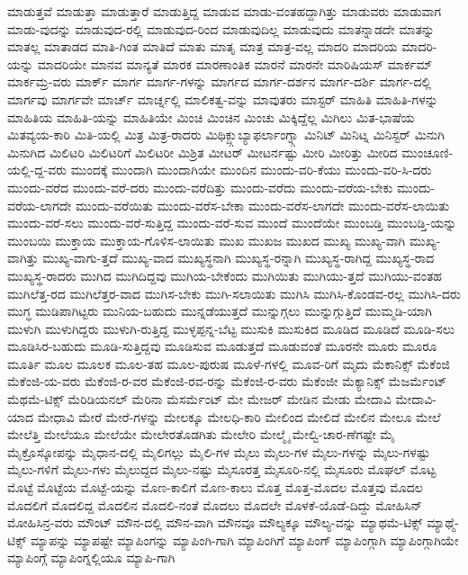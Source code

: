 {ಮಾಡುತ್ತವೆ
ಮಾಡುತ್ತಾ
ಮಾಡುತ್ತಾರೆ
ಮಾಡುತ್ತಿದ್ದ
ಮಾಡುವ
ಮಾಡು-ವಂತಹದ್ದಾಗಿತ್ತು
ಮಾಡುವರು
ಮಾಡುವಾಗ
ಮಾಡು-ವುದನ್ನು
ಮಾಡುವುದ-ರಲ್ಲಿ
ಮಾಡುವುದ-ರಿಂದ
ಮಾಡುವುದಿಲ್ಲ
ಮಾಡುವುದು
ಮಾತನ್ನಾಡದೇ
ಮಾತನ್ನು
ಮಾತಲ್ಲ
ಮಾತಾಡದ
ಮಾತಿ-ಗಿಂತ
ಮಾತಿದೆ
ಮಾತು
ಮಾತೃ
ಮಾತ್ರ
ಮಾತ್ರ-ವಲ್ಲ
ಮಾದರಿ
ಮಾದರಿಯ
ಮಾದರಿ-ಯನ್ನು
ಮಾದರಿಯೇ
ಮಾನವ
ಮಾನ್ಯತೆ
ಮಾರಕ
ಮಾರಣಾಂತಿಕ
ಮಾರನೆ
ಮಾರನೇ
ಮಾರಿಷಿಯಸ್
ಮಾರ್ಕಮ್
ಮಾರ್ಕಮ್ರ-ವರು
ಮಾರ್ಕ್
ಮಾರ್ಗ
ಮಾರ್ಗ-ಗಳನ್ನು
ಮಾರ್ಗದ
ಮಾರ್ಗ-ದರ್ಶನ
ಮಾರ್ಗ-ದರ್ಶಿ
ಮಾರ್ಗ-ದಲ್ಲಿ
ಮಾರ್ಗವು
ಮಾರ್ಗವೇ
ಮಾರ್ಚ್
ಮಾರ್ಚ್ನಲ್ಲಿ
ಮಾಲಿಕತ್ವ-ವನ್ನು
ಮಾವುತರು
ಮಾಸ್ಟರ್
ಮಾಹಿತಿ
ಮಾಹಿತಿ-ಗಳನ್ನು
ಮಾಹಿತಿಯ
ಮಾಹಿತಿ-ಯನ್ನು
ಮಾಹಿತಿಯೇ
ಮಿಂಚಿ
ಮಿಂಚಿನ
ಮಿಂಚು
ಮಿಕ್ಕಿದ್ದೆಲ್ಲ
ಮಿಗಿಲು
ಮಿತ-ಭಾಷೆಯ
ಮಿತವ್ಯಯ-ಕಾರಿ
ಮಿತಿ-ಯಲ್ಲಿ
ಮಿತ್ರ
ಮಿತ್ರ-ರಾದರು
ಮಿಥಿಕ್ದ್ಗುಬ್ಯಾಫರ್ಲಾಂಗ್ನ್ಗಾ
ಮಿನಿಟ್
ಮಿನಿಟ್ನ
ಮಿನಿಸ್ಟರ್
ಮಿನುಗಿ
ಮಿನುಗಿದ
ಮಿಲಿಟರಿ
ಮಿಲಿಟರಿಗೆ
ಮಿಲಿಟರೀ
ಮಿಶ್ರಿತ
ಮೀಟರ್
ಮೀಟರ್ನಷ್ಟು
ಮೀರಿ
ಮೀರಿತ್ತು
ಮೀರಿದ
ಮುಂಚೂಣಿ-ಯಲ್ಲಿ-ದ್ದ-ವರು
ಮುಂದಕ್ಕೆ
ಮುಂದಾಗಿ
ಮುಂದಾಗಿಯೇ
ಮುಂದಿನ
ಮುಂದು-ವರಿ-ಕೆಯು
ಮುಂದು-ವರಿ-ಸಿ-ದರು
ಮುಂದು-ವರೆದ
ಮುಂದು-ವರೆ-ದರು
ಮುಂದು-ವರೆದಿತ್ತು
ಮುಂದು-ವರೆದು
ಮುಂದು-ವರೆಯ-ಬೇಕು
ಮುಂದು-ವರೆಯ-ಲಾಗದೇ
ಮುಂದು-ವರೆಯಿತು
ಮುಂದು-ವರೆಸ-ಬೇಕಾ
ಮುಂದು-ವರೆಸ-ಲಾಗದೇ
ಮುಂದು-ವರೆಸ-ಲಾಯಿತು
ಮುಂದು-ವರೆ-ಸಲು
ಮುಂದು-ವರೆ-ಸುತ್ತಿದ್ದ
ಮುಂದು-ವರೆ-ಸುವ
ಮುಂದೆ
ಮುಂದೆಯೇ
ಮುಂಬಡ್ತಿ
ಮುಂಬಡ್ತಿ-ಯನ್ನು
ಮುಂಬಯಿ
ಮುಕ್ತಾಯ
ಮುಕ್ತಾಯ-ಗೊಳಿಸ-ಲಾಯಿತು
ಮುಖ
ಮುಖಜ
ಮುಖದ
ಮುಖ್ಯ
ಮುಖ್ಯ-ವಾಗಿ
ಮುಖ್ಯ-ವಾಗಿತ್ತು
ಮುಖ್ಯ-ವಾಗು-ತ್ತದೆ
ಮುಖ್ಯ-ವಾದ
ಮುಖ್ಯಸ್ಥನಾಗಿ
ಮುಖ್ಯಸ್ಥ-ರನ್ನಾಗಿ
ಮುಖ್ಯಸ್ಥ-ರಾಗಿದ್ದ
ಮುಖ್ಯಸ್ಥ-ರಾದ
ಮುಖ್ಯಸ್ಥ-ರಾದರು
ಮುಗಿದ
ಮುಗಿದಿದ್ದವು
ಮುಗಿಯ-ಬೇಕೆಂದು
ಮುಗಿಯಿತು
ಮುಗಿಯು-ತ್ತದೆ
ಮುಗಿಯು-ವಂತಹ
ಮುಗಿಲೆತ್ತ-ರದ
ಮುಗಿಲೆತ್ತರ-ವಾದ
ಮುಗಿಸ-ಬೇಕು
ಮುಗಿ-ಸಲಾಯಿತು
ಮುಗಿಸಿ
ಮುಗಿಸಿ-ಕೊಂಡವ-ರಲ್ಲ
ಮುಗಿಸಿ-ದರು
ಮುಗ್ಧ
ಮುಡಿಪಾಗಿಟ್ಟರು
ಮುನಿಯ-ಬಹುದು
ಮುನ್ನಡೆಯುತ್ತದೆ
ಮುನ್ನುಗ್ಗಲು
ಮುನ್ನುಗ್ಗುತ್ತಿದೆ
ಮುಮ್ಮಡಿ-ಯಾಗಿ
ಮುಳುಗಿ
ಮುಳುಗಿದ್ದರು
ಮುಳುಗಿ-ರುತ್ತಿದ್ದ
ಮುಳ್ಳಪ್ಪನ್ನ-ಬೆಟ್ಟ
ಮುಸುಕಿ
ಮುಸುಕಿದ
ಮೂಡಿದ
ಮೂಡಿದೆ
ಮೂಡಿ-ಸಲು
ಮೂಡಿಸಿರ-ಬಹುದು
ಮೂಡಿ-ಸುತ್ತಿದ್ದವು
ಮೂಡಿಸುವ
ಮೂಡುತ್ತದೆ
ಮೂಡುವಂತೆ
ಮೂರನೇ
ಮೂರು
ಮೂರೂ
ಮೂರ್ತಿ
ಮೂಲ
ಮೂಲಕ
ಮೂಲ-ತಹ
ಮೂಲ-ಪುರುಷ
ಮೂಳೆ-ಗಳಲ್ಲಿ
ಮೂವ-ರಿಗೆ
ಮೃದು
ಮೆಕಾನಿಕ್ಸ್
ಮೆಕೆಂಜಿ
ಮೆಕೆಂಜಿ-ಯ-ವರು
ಮೆಕೆಂಜಿ-ರ-ವರ
ಮೆಕೆಂಜಿ-ರವ-ರನ್ನು
ಮೆಕೆಂಜಿ-ರ-ವರು
ಮೆಕೆಂಜೀ
ಮೆಕ್ಯಾನಿಕ್ಸ್
ಮೆಜರ್ಮೆಂಟ್
ಮೆಥಮೆ-ಟಿಕ್ಸ್
ಮೆರಿಡಿಯನಲ್
ಮೆರಿನಾ
ಮೆಸರ್ಮೆಂಟ್
ಮೇ
ಮೇಜರ್
ಮೇಡಿನ
ಮೇಡು
ಮೇದಾವಿ
ಮೇದಾವಿ-ಯಾದ
ಮೇಧಾವಿ
ಮೇರೆ
ಮೇರೆ-ಗಳನ್ನು
ಮೇಲಕ್ಕೂ
ಮೇಲಧಿ-ಕಾರಿ
ಮೇಲಿಂದ
ಮೇಲಿದೆ
ಮೇಲಿನ
ಮೇಲೂ
ಮೇಲೆ
ಮೇಲೆತ್ತಿ
ಮೇಲೆಯೂ
ಮೇಲೆಯೇ
ಮೇಲೇರತೊಡಗಿತು
ಮೇಲೇರಿ
ಮೇಲ್ಮೈ
ಮೇಲ್ವಿ-ಚಾರ-ಣೆಗಷ್ಟೇ
ಮೈ
ಮೈಕ್ರೊಸ್ಕೋಪನ್ನು
ಮೈಧಾನ-ದಲ್ಲಿ
ಮೈಲಿಗಲ್ಲು
ಮೈಲಿ-ಗಳ
ಮೈಲು
ಮೈಲು-ಗಳ
ಮೈಲು-ಗಳನ್ನು
ಮೈಲು-ಗಳಷ್ಟು
ಮೈಲು-ಗಳಿಗೆ
ಮೈಲು-ಗಳು
ಮೈಲುದ್ದದ
ಮೈಲು-ನಷ್ಟು
ಮೈಸೂರತ್ತ
ಮೈಸೂರಿ-ನಲ್ಲಿ
ಮೈಸೂರು
ಮೊಘಲ್
ಮೊಟ್ಟ
ಮೊಟ್ಟೆ
ಮೊಟ್ಟೆಯ
ಮೊಟ್ಟೆ-ಯನ್ನು
ಮೊಣ-ಕಾಲಿಗೆ
ಮೊಣ-ಕಾಲು
ಮೊತ್ತ
ಮೊತ್ತ-ಮೊದಲ
ಮೊತ್ತವು
ಮೊದಲ
ಮೊದಲಿಗೆ
ಮೊದಲಿದ್ದ
ಮೊದಲಿನ
ಮೊದಲಿ-ನಂತೆ
ಮೊದಲು
ಮೊದಲೇ
ಮೊಳಕೆ-ಯೊಡೆ-ದಿದ್ದು
ಮೋಹಿಸಿನ್
ಮೋಹಿಸಿನ್ರ-ವರು
ಮೌಂಟ್
ಮೌನ-ದಲ್ಲಿ
ಮೌನ-ವಾಗಿ
ಮೌನವೂ
ಮೌಲ್ಯಕ್ಕೂ
ಮೌಲ್ಯ-ವನ್ನು
ಮ್ಯಾಥಮೆ-ಟಿಕ್ಸ್
ಮ್ಯಾಥ್ಮೆ-ಟಿಕ್ಸ್
ಮ್ಯಾಪನ್ನು
ಮ್ಯಾಪಷ್ಟೇ
ಮ್ಯಾಪಿಂಗನ್ನು
ಮ್ಯಾಪಿಂಗಿ-ಗಾಗಿ
ಮ್ಯಾಪಿಂಗಿಗೆ
ಮ್ಯಾಪಿಂಗ್
ಮ್ಯಾಪಿಂಗ್ಗಾಗಿ
ಮ್ಯಾಪಿಂಗ್ಗಾಗಿಯೇ
ಮ್ಯಾಪಿಂಗ್ಗೆ
ಮ್ಯಾಪಿಂಗ್ನಲ್ಲಿಯೂ
ಮ್ಯಾಪಿ-ಗಾಗಿ
}
